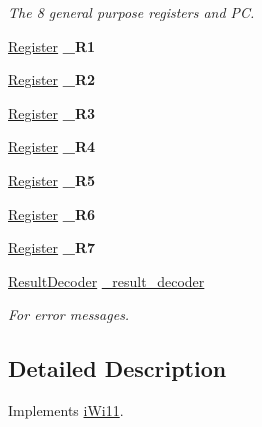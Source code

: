 \begin{DoxyCompactItemize}
\begin{DoxyCompactList}\small\item\em The 8 general purpose registers and PC. \item\end{DoxyCompactList}\item 
\hypertarget{classWi11_aa3d29c00067f173976406a1b294abe21}{
\hyperlink{classRegister}{Register} {\bfseries \_\-R1}}
\label{classWi11_aa3d29c00067f173976406a1b294abe21}

\item 
\hypertarget{classWi11_af7831a8e06325bf439bfa5121663fe84}{
\hyperlink{classRegister}{Register} {\bfseries \_\-R2}}
\label{classWi11_af7831a8e06325bf439bfa5121663fe84}

\item 
\hypertarget{classWi11_a1d05b03b7df1196df0abddd7d2a37e09}{
\hyperlink{classRegister}{Register} {\bfseries \_\-R3}}
\label{classWi11_a1d05b03b7df1196df0abddd7d2a37e09}

\item 
\hypertarget{classWi11_a3ce79df6a51764e7705aa259177bd420}{
\hyperlink{classRegister}{Register} {\bfseries \_\-R4}}
\label{classWi11_a3ce79df6a51764e7705aa259177bd420}

\item 
\hypertarget{classWi11_a3deb52eb81c25cb36572b4285eedebcb}{
\hyperlink{classRegister}{Register} {\bfseries \_\-R5}}
\label{classWi11_a3deb52eb81c25cb36572b4285eedebcb}

\item 
\hypertarget{classWi11_af45f08232aa903851a295b5259f18905}{
\hyperlink{classRegister}{Register} {\bfseries \_\-R6}}
\label{classWi11_af45f08232aa903851a295b5259f18905}

\item 
\hypertarget{classWi11_a0515ac512e8f8e3a122695f823d3abd7}{
\hyperlink{classRegister}{Register} {\bfseries \_\-R7}}
\label{classWi11_a0515ac512e8f8e3a122695f823d3abd7}

\item 
\hypertarget{classWi11_a18515d6caafb4aba3d8a9220b4ac227e}{
\hyperlink{classResultDecoder}{ResultDecoder} \hyperlink{classWi11_a18515d6caafb4aba3d8a9220b4ac227e}{\_\-result\_\-decoder}}
\label{classWi11_a18515d6caafb4aba3d8a9220b4ac227e}

\begin{DoxyCompactList}\small\item\em For error messages. \item\end{DoxyCompactList}\end{DoxyCompactItemize}


\subsection{Detailed Description}
Implements \hyperlink{classiWi11}{iWi11}. 